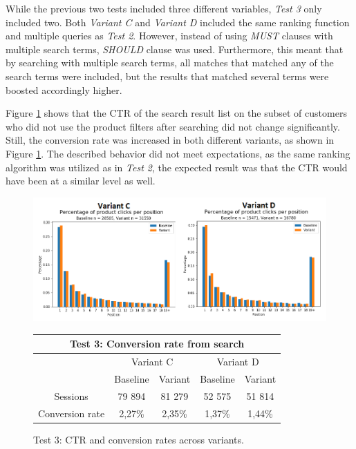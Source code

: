 

While the previous two tests included three different variables, \emph{Test 3} only included two.
Both \emph{Variant C} and \emph{Variant D} included the same ranking function and multiple queries as 
\emph{Test 2}.
However, instead of using \emph{MUST} clauses with multiple search terms, \emph{SHOULD} clause was used.
Furthermore, this meant that by searching with multiple search terms, all matches that matched any of 
the search terms were included, but the results that matched several terms were boosted accordingly higher.

Figure \ref{fig:search_v3} shows that the CTR of the search result list on the subset of customers who did not 
use the product filters after searching did not change significantly.
Still, the conversion rate was increased in both different variants, as shown in Figure \ref{fig:search_v3}.
The described behavior did not meet expectations, as the same ranking algorithm was utilized as in \emph{Test 2},
the expected result was that the CTR would have been at a similar level as well.


\begin{figure}
    \centering
    
    \includegraphics[width=\textwidth]{img/search_v3.png}

    \begin{tabular}{|c||c|c||c|c|}
    \hline
    \multicolumn{5}{|c|}{Test 3: Conversion rate from search} \\ \hline \hline
    & \multicolumn{2}{|c||}{Variant C} & \multicolumn{2}{|c|}{Variant D} \\ \cline{2-5}
    & Baseline & Variant & Baseline & Variant \\ \hline
    Sessions & 79 894 & 81 279 & 52 575 & 51 814 \\ \hline
    Conversion rate & 2,27\% & 2,35\% & 1,37\% & 1,44\% \\ \hline
    \end{tabular}
    \caption{Test 3: CTR and conversion rates across variants.}
    
    \label{fig:search_v3}
\end{figure}



